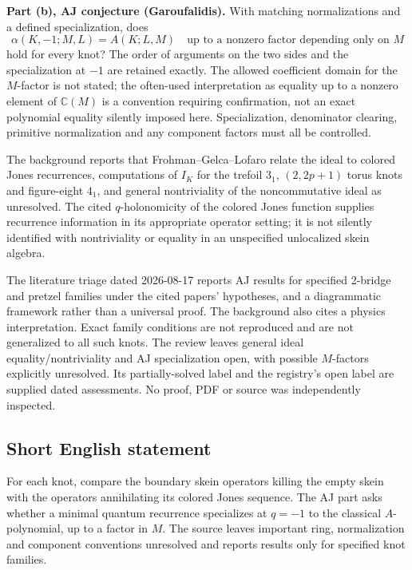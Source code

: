 \documentclass[11pt]{article}
\newcommand{\C}{\mathbb{C}}
\begin{document}
\textbf{Part (b), AJ conjecture (Garoufalidis).} With matching normalizations and a defined specialization, does
\[
 \alpha(K,-1;M,L)=A(K;L,M)
 \quad\text{up to a nonzero factor depending only on }M
\]
hold for every knot? The order of arguments on the two sides and the specialization at $-1$ are retained exactly. The allowed coefficient domain for the $M$-factor is not stated; the often-used interpretation as equality up to a nonzero element of $\C(M)$ is a convention requiring confirmation, not an exact polynomial equality silently imposed here. Specialization, denominator clearing, primitive normalization and any component factors must all be controlled.

The background reports that Frohman--Gelca--Lofaro relate the ideal to colored Jones recurrences, computations of $I_K$ for the trefoil $3_1$, $(2,2p+1)$ torus knots and figure-eight $4_1$, and general nontriviality of the noncommutative ideal as unresolved. The cited $q$-holonomicity of the colored Jones function supplies recurrence information in its appropriate operator setting; it is not silently identified with nontriviality or equality in an unspecified unlocalized skein algebra.

The literature triage dated 2026-08-17 reports AJ results for specified 2-bridge and pretzel families under the cited papers' hypotheses, and a diagrammatic framework rather than a universal proof. The background also cites a physics interpretation. Exact family conditions are not reproduced and are not generalized to all such knots. The review leaves general ideal equality/nontriviality and AJ specialization open, with possible $M$-factors explicitly unresolved. Its partially-solved label and the registry's open label are supplied dated assessments. No proof, PDF or source was independently inspected.
\subsection{Short English statement}
For each knot, compare the boundary skein operators killing the empty skein with the operators annihilating its colored Jones sequence. The AJ part asks whether a minimal quantum recurrence specializes at $q=-1$ to the classical $A$-polynomial, up to a factor in $M$. The source leaves important ring, normalization and component conventions unresolved and reports results only for specified knot families.
\end{document}
